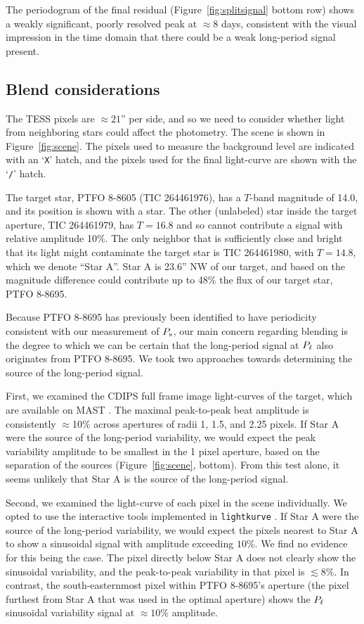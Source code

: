 \documentclass[12pt,twocolumn,tighten]{aastex62}
\begin{document}
The periodogram of the final residual (Figure~\ref{fig:splitsignal}
bottom row) shows a weakly significant, poorly resolved peak at
$\approx$8 days, consistent with the visual impression in the time
domain that there could be a weak long-period signal present.


\subsection{Blend considerations}
\label{subsec:blend}

The TESS pixels are $\approx21$'' per side, and so we need to consider
whether light from neighboring stars could affect the photometry.  The
scene is shown in Figure~\ref{fig:scene}.  
The pixels used to
measure the background level are indicated with an `\texttt{X}' hatch,
and the pixels used for the final light-curve are shown with the
`\texttt{/}' hatch.

The target star, PTFO
8-8605 (TIC 264461976), has a $T$-band magnitude of 14.0, and its position is shown with a
star.  
The other (unlabeled) star inside the target aperture, TIC 264461979, has $T=16.8$ and so cannot
contribute a signal with relative amplitude 10\%.
The only neighbor that is sufficiently close and bright that
its light might contaminate the target star is TIC 264461980, with
$T=14.8$, which we denote ``Star A''.  Star A is 23.6'' NW of our
target, and based on the magnitude difference could contribute up to
48\% the flux of our target star, PTFO 8-8695.  

Because PTFO 8-8695 has previously been identified to have periodicity
consistent with our measurement of $P_{\rm s}$, our main concern
regarding blending is the degree to which we can be certain that the
long-period signal at $P_{\rm \ell}$ also originates from PTFO 8-8695.
We took two approaches towards determining the source of the long-period signal.

First, we examined the CDIPS full frame image light-curves of the
target, which are available on MAST \citep{bouma_cluster_2019}.
The maximal peak-to-peak beat amplitude is consistently $\approx$10\%
across apertures of radii 1, 1.5, and 2.25 pixels.
If Star A were the source of the long-period variability, we would expect the
peak variability amplitude to be smallest in the 1 pixel aperture, based on the
separation of the sources (Figure~\ref{fig:scene}, bottom).
From this test alone, it seems unlikely that Star A is the source of
the long-period signal.

Second, we examined the light-curve of each pixel in the scene
individually.  We opted to use the
interactive tools implemented in
\texttt{lightkurve} \citep{lightkurve_2018}.  If Star A were the
source of the long-period variability, we would expect the pixels
nearest to Star A to show a sinusoidal signal with
amplitude exceeding $10\%$.  We find no evidence for
this being the case.  The pixel directly below Star A does not
clearly show the sinusoidal variability, and the peak-to-peak 
variability in that pixel is $\lesssim 8\%$.  In contrast, the
south-easternmost pixel within PTFO 8-8695's aperture (the pixel 
furthest from Star A that was used in the optimal aperture) shows the $P_{\rm \ell}$ sinusoidal
variability signal at $\approx 10\%$ amplitude.
\end{document}
